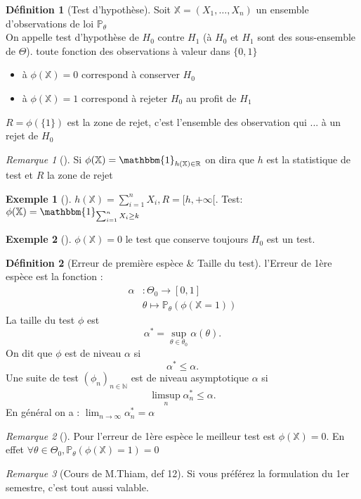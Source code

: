 \documentclass{article}
\theoremstyle{plain}%
\theoremstyle{definition}
\newtheorem{defn}{Définition}[section]
\newtheorem{exmp}{Exemple}[section]
\theoremstyle{remark}
\newtheorem*{rem}{Remarque}
\begin{document}
\begin{defn}[Test d'hypothèse]
    Soit $ \mathbb{X} = (X_1, \dots, X_n)$ un ensemble d'observations de loi $ \mathbb{P}_\theta  $  \\
    On appelle test d'hypothèse de $ H_0 $ contre $ H_1 $ (à $ H_0 $ et $ H_1 $ sont des sous-ensemble de $ \Theta  $). toute fonction des observations à valeur dans $ \{0,1\} $ \begin{itemize}
        \item à $ \phi (\mathbb{X}) = 0 $ correspond à conserver $ H_0 $ 
        \item à $ \phi (\mathbb{X}) = 1 $ correspond à rejeter $ H_0 $ au profit de $ H_1 $ 
    \end{itemize}
    $ R= \phi (\{1\}) $ est la zone de rejet, c'est l'ensemble des observation qui ... à un rejet de $ H_0 $ 
    \begin{rem}[]
        Si $ \phi (\mathbb{X}) = \mathbbm{1}_{h(\mathbb{X}) \in \mathbb{R}} $ on dira que $ h $ est la statistique de test et $ R $ la zone de rejet
    \end{rem}
    \begin{exmp}[]
        $ h(\mathbb{X}) = \sum_{i=1}^{n}X_i, R=[h, + \infty [ $. Test: $ \phi (\mathbb{X}) = \mathbbm{1}_{\sum_{i=1}^{n}X_i \geq k } $ 
    \end{exmp}
    \begin{exmp}[]
        $ \phi (\mathbb{X}) = 0 $ le test que conserve toujours $ H_0 $ est un test.
    \end{exmp}
\end{defn}

\begin{defn}[Erreur de première espèce \& Taille du test]
    l'Erreur de 1ère espèce est la fonction : \begin{align*}
        \alpha &: \Theta _0 \rightarrow [0,1] \\
                & \theta \mapsto \mathbb{P}_\theta (\phi (\mathbb{X}=1))
    \end{align*}
    La taille du test $ \phi  $ est 
    \[
        \alpha ^* = \sup_{\theta \in \theta _0} \alpha (\theta)
    .\]
    On dit que $ \phi  $ est de niveau $ \alpha $ si 
    \[
        \alpha ^* \leq \alpha 
    .\]
    Une suite de test $ (\phi _n)_{n \in \mathbb{N}} $ est de niveau asymptotique $ \alpha  $ si 
    \[
        \limsup _n \alpha _n^* \leq \alpha 
    .\]
    En général on a : $ \lim_{n \to \infty} \alpha ^*_n = \alpha $
    \begin{rem}[]
        Pour l'erreur de 1ère espèce le meilleur test est $ \phi (\mathbb{X})=0 $. En effet $ \forall \theta \in \Theta _0, \mathbb{P}_\theta (\phi (\mathbb{X}) = 1 ) = 0 $ 
    \end{rem}
    \begin{rem}[Cours de M.Thiam, def 12]
        Si vous préférez la formulation du 1er semestre, c'est tout aussi valable.
    \end{rem}   
\end{defn}
\end{document}
